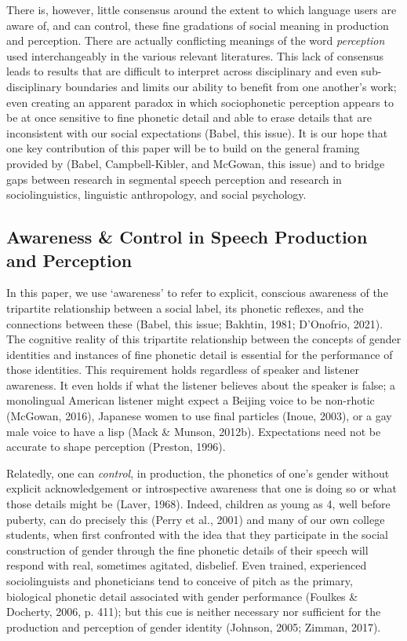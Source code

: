 \documentclass[
  letterpaper,
  DIV=11,
  numbers=noendperiod]{scrartcl}
\begin{document}
There is, however, little consensus around the extent to which language
users are aware of, and can control, these fine gradations of social
meaning in production and perception. There are actually conflicting
meanings of the word \emph{perception} used interchangeably in the
various relevant literatures. This lack of consensus leads to results
that are difficult to interpret across disciplinary and even
sub-disciplinary boundaries and limits our ability to benefit from one
another's work; even creating an apparent paradox in which sociophonetic
perception appears to be at once sensitive to fine phonetic detail and
able to erase details that are inconsistent with our social expectations
(Babel, this issue). It is our hope that one key contribution of this
paper will be to build on the general framing provided by (Babel,
Campbell-Kibler, and McGowan, this issue) and to bridge gaps between
research in segmental speech perception and research in
sociolinguistics, linguistic anthropology, and social psychology.

\subsection{Awareness \& Control in Speech Production and
Perception}\label{sec-background}

In this paper, we use `awareness' to refer to explicit, conscious
awareness of the tripartite relationship between a social label, its
phonetic reflexes, and the connections between these (Babel, this issue;
Bakhtin, 1981; D'Onofrio, 2021). The cognitive reality of this
tripartite relationship between the concepts of gender identities and
instances of fine phonetic detail is essential for the performance of
those identities. This requirement holds regardless of speaker and
listener awareness. It even holds if what the listener believes about
the speaker is false; a monolingual American listener might expect a
Beijing voice to be non-rhotic (McGowan, 2016), Japanese women to use
final particles (Inoue, 2003), or a gay male voice to have a lisp (Mack
\& Munson, 2012b). Expectations need not be accurate to shape perception
(Preston, 1996).

Relatedly, one can \emph{control}, in production, the phonetics of one's
gender without explicit acknowledgement or introspective awareness that
one is doing so or what those details might be (Laver, 1968). Indeed,
children as young as 4, well before puberty, can do precisely this
(Perry et al., 2001) and many of our own college students, when first
confronted with the idea that they participate in the social
construction of gender through the fine phonetic details of their speech
will respond with real, sometimes agitated, disbelief. Even trained,
experienced sociolinguists and phoneticians tend to conceive of pitch as
the primary, biological phonetic detail associated with gender
performance (Foulkes \& Docherty, 2006, p. 411); but this cue is neither
necessary nor sufficient for the production and perception of gender
identity (Johnson, 2005; Zimman, 2017).
\end{document}
